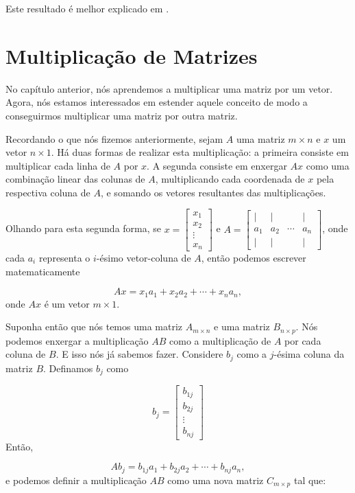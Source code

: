 Este resultado é melhor explicado em \cite{strang2006linear}.

\section{Multiplicação de Matrizes}

No capítulo anterior, nós aprendemos a multiplicar uma matriz por um vetor. Agora, nós estamos interessados em estender aquele conceito de modo a conseguirmos multiplicar uma matriz por outra matriz.

Recordando o que nós fizemos anteriormente, sejam $A$ uma matriz $m\times n$ e $x$ um vetor $n\times 1$. Há duas formas de realizar esta multiplicação: a primeira consiste em multiplicar cada linha de $A$ por $x$. A segunda consiste em enxergar $Ax$ como uma combinação linear das colunas de $A$, multiplicando cada coordenada de $x$ pela respectiva coluna de $A$, e somando os vetores resultantes das multiplicações.

Olhando para esta segunda forma, se $x = \begin{bmatrix}
	x_1 \\
	x_2 \\
	\vdots \\
	x_n
\end{bmatrix}$ e $A = \begin{bmatrix}
	| & | & & | \\
	a_1 & a_2 & \cdots & a_n \\
	| & | & & |
\end{bmatrix}$, onde cada $a_i$ representa o $i$-ésimo vetor-coluna de $A$, então podemos escrever matematicamente

$$
Ax = x_1a_1 + x_2a_2 + \cdots + x_na_n,
$$
onde $Ax$ é um vetor $m\times 1$.

Suponha então que nós temos uma matriz $A_{m\times n}$ e uma matriz $B_{n\times p}$. Nós podemos enxergar a multiplicação $AB$ como a multiplicação de $A$ por cada coluna de $B$. E isso nós já sabemos fazer. Considere $b_j$ como a $j$-ésima coluna da matriz $B$. Definamos $b_j$ como

$$
b_j = \begin{bmatrix}
	b_{1j} \\
	b_{2j}  \\
	\vdots \\
	b_{nj}
\end{bmatrix}
$$
Então,

$$
Ab_j = b_{1j}a_1 + b_{2j}a_2 + \cdots + b_{nj}a_n,
$$
e podemos definir a multiplicação $AB$ como uma nova matriz $C_{m\times p}$ tal que:

